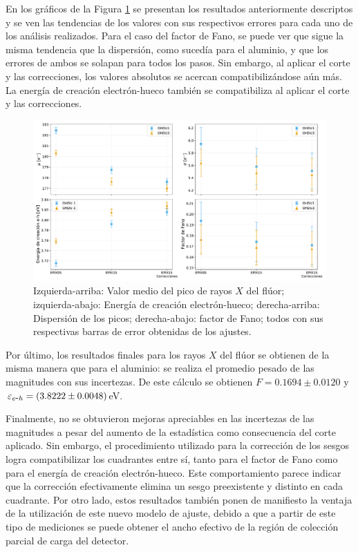 En los gráficos de la Figura \ref{fig:F_mu_sigma_fano_eh} se presentan los resultados anteriormente descriptos y se ven las tendencias de los valores con sus respectivos errores para cada uno de los análisis realizados. Para el caso del factor de Fano, se puede ver que sigue la misma tendencia que la dispersión, como sucedía para el aluminio, y que los errores de ambos se solapan para todos los pasos. Sin embargo, al aplicar el corte y las correcciones, los valores absolutos se acercan compatibilizándose aún más. La energía de creación electrón-hueco también se compatibiliza al aplicar el corte y las correcciones.
\begin{figure}[h]
    \centering
        \includegraphics[scale=0.45]{Figs/F_mu_sigma_fano_Eeh.pdf}
    \caption{Izquierda-arriba: Valor medio del pico de rayos $X$ del flúor; izquierda-abajo: Energía de creación electrón-hueco; derecha-arriba: Dispersión de los picos; derecha-abajo: factor de Fano; todos con sus respectivas barras de error obtenidas de los ajustes.}
    \label{fig:F_mu_sigma_fano_eh}
\end{figure}

Por último, los resultados finales para los rayos $X$ del flúor se obtienen de la misma manera que para el aluminio:  se realiza el promedio pesado de las magnitudes con sus incertezas. De este cálculo se obtienen $F = 0.1694 \pm 0.0120 $ y $\varepsilon_{e\mbox{-}h} =(3.8222\pm0.0048)$eV.

Finalmente, no se obtuvieron mejoras apreciables en las incertezas de las magnitudes a pesar del aumento de la estadística como consecuencia del corte aplicado. Sin embargo, el procedimiento utilizado para la corrección de los sesgos logra compatibilizar los cuadrantes entre sí, tanto para el factor de Fano como para el energía de creación electrón-hueco. Este comportamiento parece indicar que la corrección efectivamente elimina un sesgo preexistente y distinto en cada cuadrante.
Por otro lado, estos resultados también ponen de manifiesto la ventaja de la utilización de este nuevo modelo de ajuste, debido a que a partir de este tipo de mediciones se puede obtener el ancho efectivo de la región de colección parcial de carga del detector.

